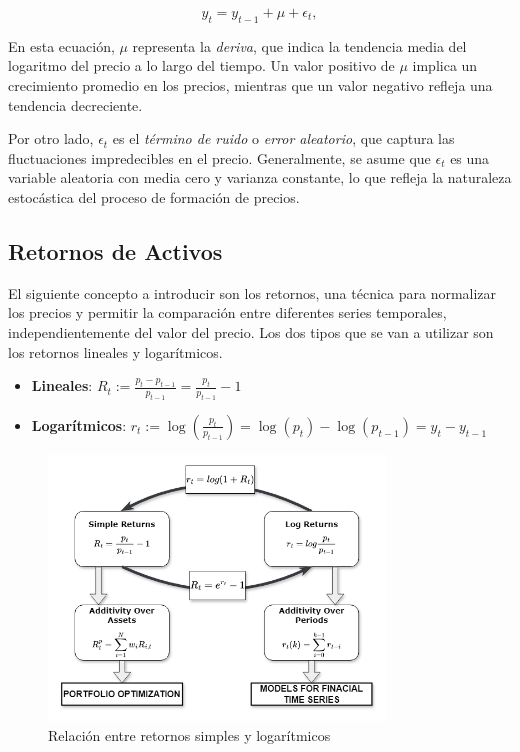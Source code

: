 \documentclass[a4paper,12pt, twoside]{report}
\begin{document}
\begin{equation}
y_t = y_{t-1} + \mu + \epsilon_t,
\end{equation}

En esta ecuación, $\mu$ representa la \textit{deriva}, que indica la tendencia media 
del logaritmo del precio a lo largo del tiempo. Un valor positivo de $\mu$ implica un 
crecimiento promedio en los precios, mientras que un valor negativo refleja una tendencia decreciente. 

Por otro lado, $\epsilon_t$ es el \textit{término de ruido} o \textit{error aleatorio}, que captura 
las fluctuaciones impredecibles en el precio. Generalmente, se asume que $\epsilon_t$ es 
una variable aleatoria con media cero y varianza constante, lo que refleja la naturaleza 
estocástica del proceso de formación de precios.



\subsection{Retornos de Activos}

El siguiente concepto a introducir son los retornos, una técnica para normalizar los precios y permitir la comparación 
entre diferentes series temporales, independientemente del valor del precio. Los dos tipos que se van a utilizar son 
los retornos lineales y logarítmicos.

\begin{itemize}
    \item \textbf{Lineales}: $R_t := \frac{p_t - p_{t-1}}{p_{t-1}} = \frac{p_t}{p_{t-1}} - 1$
    \item \textbf{Logarítmicos}: $r_t := \log\left(\frac{p_t}{p_{t-1}}\right) = \log(p_t) - \log(p_{t-1}) = y_t - y_{t-1}$
\end{itemize}

\begin{figure}[H]
    \centering
    \includegraphics[width=0.8\textwidth]{figures/simple_and_log_ret_relation.png}
    \caption{Relación entre retornos simples y logarítmicos}
    \label{fig:log-returns}
\end{figure}
\end{document}
